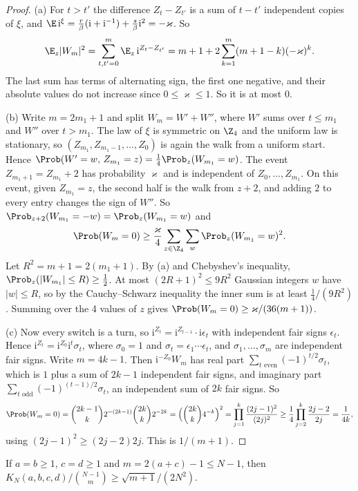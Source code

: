 \begin{proof}
(a) For $t>t'$ the difference $Z_t-Z_{t'}$ is a sum of $t-t'$ independent copies of $\xi$, and
$\E\,\mathrm i^\xi=\frac r\beta(\mathrm i+\mathrm i^{-1})+\frac s\beta\mathrm i^2=-\varkappa$. So
\[
 \E_z\lvert W_m\rvert^2=\sum_{t,t'=0}^m\E_z\,\mathrm i^{Z_t-Z_{t'}}
 =m+1+2\sum_{k=1}^m(m+1-k)(-\varkappa)^k .
\]
The last sum has terms of alternating sign, the first one negative, and their absolute values do
not increase since $0\le\varkappa\le1$. So it is at most $0$.

(b) Write $m=2m_1+1$ and split $W_m=W'+W''$, where $W'$ sums over $t\le m_1$ and $W''$ over
$t>m_1$. The law of $\xi$ is symmetric on $\Z_4$ and the uniform law is stationary, so
$(Z_{m_1},Z_{m_1-1},\dots,Z_0)$ is again the walk from a uniform start. Hence
$\Prob(W'=w,\,Z_{m_1}=z)=\frac14\Prob_z(W_{m_1}=w)$. The event $Z_{m_1+1}=Z_{m_1}+2$ has probability
$\varkappa$ and is independent of $Z_0,\dots,Z_{m_1}$. On this event, given $Z_{m_1}=z$, the second
half is the walk from $z+2$, and adding $2$ to every entry changes the sign of $W''$. So
$\Prob_{z+2}(W_{m_1}=-w)=\Prob_z(W_{m_1}=w)$ and
\[
 \Prob(W_m=0)\ge\frac\varkappa4\sum_{z\in\Z_4}\sum_w\Prob_z(W_{m_1}=w)^2 .
\]
Let $R^2=m+1=2(m_1+1)$. By (a) and Chebyshev's inequality, $\Prob_z(\lvert W_{m_1}\rvert\le R)\ge\frac12$.
At most $(2R+1)^2\le9R^2$ Gaussian integers $w$ have $\lvert w\rvert\le R$, so by the
Cauchy--Schwarz inequality the inner sum is at least $\frac14/(9R^2)$. Summing over the 4 values
of $z$ gives $\Prob(W_m=0)\ge\varkappa/(36(m+1))$.

(c) Now every switch is a turn, so $\mathrm i^{Z_t}=\mathrm i^{Z_{t-1}}\cdot\mathrm i\epsilon_t$
with independent fair signs $\epsilon_t$. Hence $\mathrm i^{Z_t}=\mathrm i^{Z_0}\mathrm i^t\sigma_t$,
where $\sigma_0=1$ and $\sigma_t=\epsilon_1\cdots\epsilon_t$, and $\sigma_1,\dots,\sigma_m$ are
independent fair signs. Write $m=4k-1$. Then $\mathrm i^{-Z_0}W_m$ has real part
$\sum_{t\text{ even}}(-1)^{t/2}\sigma_t$, which is $1$ plus a sum of $2k-1$ independent fair signs,
and imaginary part $\sum_{t\text{ odd}}(-1)^{(t-1)/2}\sigma_t$, an independent sum of $2k$ fair
signs. So
\[
 \Prob(W_m=0)=\binom{2k-1}k2^{-(2k-1)}\binom{2k}k2^{-2k}=\Bigl(\binom{2k}k4^{-k}\Bigr)^2
 =\prod_{j=1}^k\frac{(2j-1)^2}{(2j)^2}\ge\frac14\prod_{j=2}^k\frac{2j-2}{2j}=\frac1{4k},
\]
using $(2j-1)^2\ge(2j-2)2j$. This is $1/(m+1)$.
\end{proof}

\begin{lemma}\label{lem:balanced}
If $a=b\ge1$, $c=d\ge1$ and $m=2(a+c)-1\le N-1$, then
$K_N(a,b,c,d)/\binom{N-1}m\ge\sqrt{m+1}/(2N^2)$.
\end{lemma}

